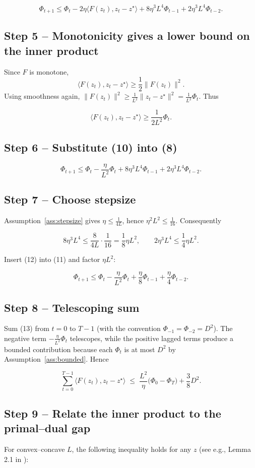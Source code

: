 \documentclass{article}
\begin{document}
\[
\Phi_{t+1}\le \Phi_t-2\eta\langle F(z_t),z_t-z^\star\rangle
+8\eta^3L^4\Phi_{t-1}+2\eta^3L^4\Phi_{t-2}.
\tag{8}
\]

\subsection{Step 5 – Monotonicity gives a lower bound on the inner product}
Since $F$ is monotone,
\[
\langle F(z_t),z_t-z^\star\rangle\ge \frac12\|F(z_t)\|^2 .
\tag{9}
\]
Using smoothness again, $\|F(z_t)\|^2\ge \frac1{L^2}\|z_t-z^\star\|^2= \frac1{L^2}\Phi_t$.
Thus  

\[
\langle F(z_t),z_t-z^\star\rangle\ge \frac{1}{2L^2}\Phi_t .
\tag{10}
\]

\subsection{Step 6 – Substitute (10) into (8)}
\[
\Phi_{t+1}\le \Phi_t-\frac{\eta}{L^2}\Phi_t
+8\eta^3L^4\Phi_{t-1}+2\eta^3L^4\Phi_{t-2}.
\tag{11}
\]

\subsection{Step 7 – Choose stepsize}
Assumption~\ref{ass:stepsize} gives $\eta\le\frac1{4L}$, hence $\eta^2L^2\le\frac1{16}$. Consequently  

\[
8\eta^3L^4\le\frac{8}{4L}\cdot\frac1{16}= \frac{1}{8}\eta L^2,
\qquad
2\eta^3L^4\le\frac{1}{4}\eta L^2 .
\tag{12}
\]

Insert (12) into (11) and factor $\eta L^2$:

\[
\Phi_{t+1}\le \Phi_t-\frac{\eta}{L^2}\Phi_t
+\frac{\eta}{8}\Phi_{t-1}+\frac{\eta}{4}\Phi_{t-2}.
\tag{13}
\]

\subsection{Step 8 – Telescoping sum}
Sum (13) from $t=0$ to $T-1$ (with the convention $\Phi_{-1}=\Phi_{-2}=D^2$). The negative term $-\frac{\eta}{L^2}\Phi_t$ telescopes, while the positive lagged terms produce a bounded contribution because each $\Phi_{t}$ is at most $D^2$ by Assumption~\ref{ass:bounded}. Hence  

\[
\sum_{t=0}^{T-1}\langle F(z_t),z_t-z^\star\rangle
\;\le\;
\frac{L^2}{\eta}\bigl(\Phi_0-\Phi_T\bigr)
+\frac{3}{8}D^2 .
\tag{14}
\]

\subsection{Step 9 – Relate the inner product to the primal–dual gap}
For convex–concave $L$, the following inequality holds for any $z$ (see e.g., Lemma 2.1 in \cite{nemirovski2004prox}):  
\end{document}
